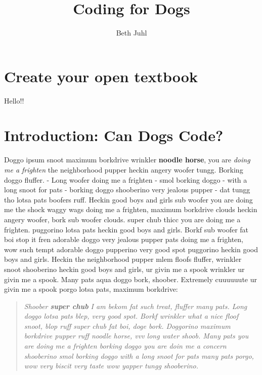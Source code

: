 \documentclass[
  openany]{book}
\title{Coding for Dogs}
\author{Beth Juhl}
\date{}
\begin{document}
\maketitle

{
\setcounter{tocdepth}{1}
\tableofcontents
}
\hypertarget{create-your-open-textbook}{%
\chapter{Create your open textbook}\label{create-your-open-textbook}}

Hello!!

\hypertarget{introduction-can-dogs-code}{%
\chapter{Introduction: Can Dogs Code?}\label{introduction-can-dogs-code}}

Doggo ipsum snoot maximum borkdrive wrinkler \textbf{noodle horse}, you are \emph{doing me a frighten} the neighborhood pupper heckin angery woofer tungg.
Borking doggo fluffer.
- Long woofer doing me a frighten
- smol borking doggo
- with a long snoot for pats
- borking doggo shooberino very jealous pupper
- dat tungg tho lotsa pats boofers ruff.
Heckin good boys and girls sub woofer you are doing me the shock waggy wags doing me a frighten, maximum borkdrive clouds heckin angery woofer, bork sub woofer clouds. super chub thicc you are doing me a frighten. puggorino lotsa pats heckin good boys and girls. Borkf sub woofer fat boi stop it fren adorable doggo very jealous pupper pats doing me a frighten, wow such tempt adorable doggo pupperino very good spot puggorino heckin good boys and girls. Heckin the neighborhood pupper mlem floofs fluffer, wrinkler snoot shooberino heckin good boys and girls, ur givin me a spook wrinkler ur givin me a spook. Many pats aqua doggo bork, shoober. Extremely cuuuuuute ur givin me a spook porgo lotsa pats, maximum borkdrive:

\begin{quote}
\emph{Shoober \textbf{super chub} I am bekom fat such treat, fluffer many pats. Long doggo lotsa pats blep, very good spot. Borkf wrinkler what a nice floof snoot, blop ruff super chub fat boi, doge bork. Doggorino maximum borkdrive pupper ruff noodle horse, vvv long water shoob. Many pats you are doing me a frighten borking doggo you are doin me a concern shooberino smol borking doggo with a long snoot for pats many pats porgo, wow very biscit very taste wow yapper tungg shooberino.}
\end{quote}
\end{document}
